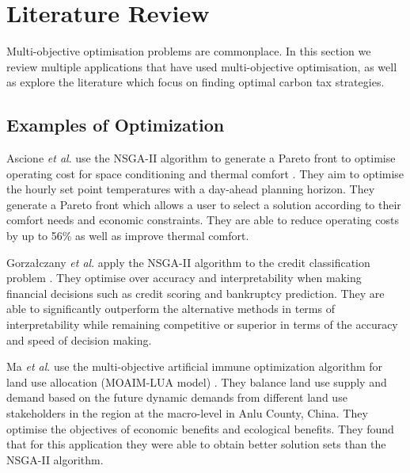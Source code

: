 \documentclass[sigconf]{acmart}
\begin{document}








\section{Literature Review}
\label{sec:lit_review}

Multi-objective optimisation problems are commonplace. In this section we review multiple applications that have used multi-objective optimisation, as well as explore the literature which focus on finding optimal carbon tax strategies.

\subsection{Examples of Optimization}

Ascione  \textit{et al}. use the NSGA-II algorithm to generate a Pareto front to optimise operating cost for space conditioning and thermal comfort \cite{Ascione2016}. They aim to optimise the hourly set point temperatures with a day-ahead planning horizon. They generate a Pareto front which allows a user to select a solution according to their comfort needs and economic constraints. They are able to reduce operating costs by up to 56\% as well as improve thermal comfort.

Gorza\l{}czany \textit{et al}. apply the NSGA-II algorithm to the credit classification problem \cite{Gorzaczany2016}. They optimise over accuracy and interpretability when making financial decisions such as credit scoring and bankruptcy prediction. They are able to significantly outperform the alternative methods in terms of interpretability while remaining competitive or superior in terms of the accuracy and speed of decision making.

Ma \textit{et al}. use the multi-objective artificial immune optimization algorithm for land use allocation (MOAIM-LUA model) \cite{Ma2015}. They balance land use supply and demand based on the future dynamic demands from different land use stakeholders in the region at the macro-level in Anlu County, China. They optimise the objectives of economic benefits and ecological benefits. They found that for this application they were able to obtain better solution sets than the NSGA-II algorithm.
\end{document}
